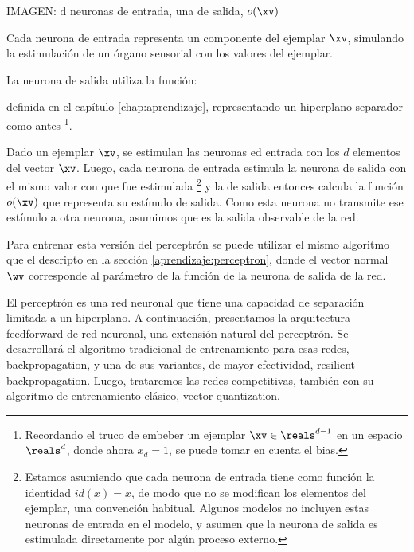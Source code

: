 IMAGEN: d neuronas de entrada, una de salida, $o(\xv)$

Cada neurona de entrada representa un componente del ejemplar $\xv$, simulando la estimulación de un órgano sensorial con los valores del ejemplar.

La neurona de salida utiliza la función:

 definida en el capítulo \ref{chap:aprendizaje}, representando un hiperplano separador como antes \footnote{Recordando el truco de embeber un ejemplar $\xv \in \reals^{d-1}$ en un espacio $\reals^{d}$, donde ahora $x_{d}=1$, se puede tomar en cuenta el bias.}.

Dado un ejemplar $\xv$, se estimulan las neuronas ed entrada con los $d$ elementos del vector $\xv$. Luego, cada neurona de entrada estimula la neurona de salida con el mismo valor con que fue estimulada \footnote{Estamos asumiendo que cada neurona de entrada tiene como función la identidad $id(x)=x$, de modo que no se modifican los elementos del ejemplar, una convención habitual. Algunos modelos no incluyen estas neuronas de entrada en el modelo, y asumen que la neurona de salida es estimulada directamente por algún proceso externo.} y la de salida entonces calcula la función $o(\xv)$ que representa su estímulo de salida. Como esta neurona no transmite ese estímulo a otra neurona, asumimos que es la salida observable de la red.

Para entrenar esta versión del perceptrón se puede utilizar el mismo algoritmo que el descripto en la sección \ref{aprendizaje:perceptron}, donde el vector normal $\wv$ corresponde al parámetro de la función de la neurona de salida de la red.

El perceptrón es una red neuronal que tiene una capacidad de separación limitada a un hiperplano. A continuación, presentamos la arquitectura feedforward de red neuronal, una extensión natural del perceptrón. Se desarrollará el algoritmo tradicional de entrenamiento para esas redes, backpropagation, y una de sus variantes, de mayor efectividad, resilient backpropagation. Luego, trataremos las redes competitivas, también con su algoritmo de entrenamiento clásico, vector quantization.


